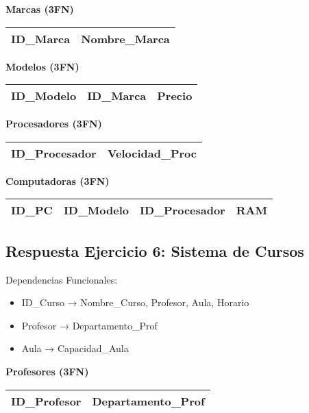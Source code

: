 \documentclass[12pt]{article}
\begin{document}
\textbf{Marcas (3FN)}
\begin{center}
\begin{tabular}{|l|l|}
\hline
ID\_Marca & Nombre\_Marca \\
\hline
\end{tabular}
\end{center}

\textbf{Modelos (3FN)}
\begin{center}
\begin{tabular}{|l|l|l|}
\hline
ID\_Modelo & ID\_Marca & Precio \\
\hline
\end{tabular}
\end{center}

\textbf{Procesadores (3FN)}
\begin{center}
\begin{tabular}{|l|l|}
\hline
ID\_Procesador & Velocidad\_Proc \\
\hline
\end{tabular}
\end{center}

\textbf{Computadoras (3FN)}
\begin{center}
\begin{tabular}{|l|l|l|l|}
\hline
ID\_PC & ID\_Modelo & ID\_Procesador & RAM \\
\hline
\end{tabular}
\end{center}

\subsection{Respuesta Ejercicio 6: Sistema de Cursos}

Dependencias Funcionales:
\begin{itemize}
    \item ID\_Curso → Nombre\_Curso, Profesor, Aula, Horario
    \item Profesor → Departamento\_Prof
    \item Aula → Capacidad\_Aula
\end{itemize}

\textbf{Profesores (3FN)}
\begin{center}
\begin{tabular}{|l|l|}
\hline
ID\_Profesor & Departamento\_Prof \\
\hline
\end{tabular}
\end{center}
\end{document}
